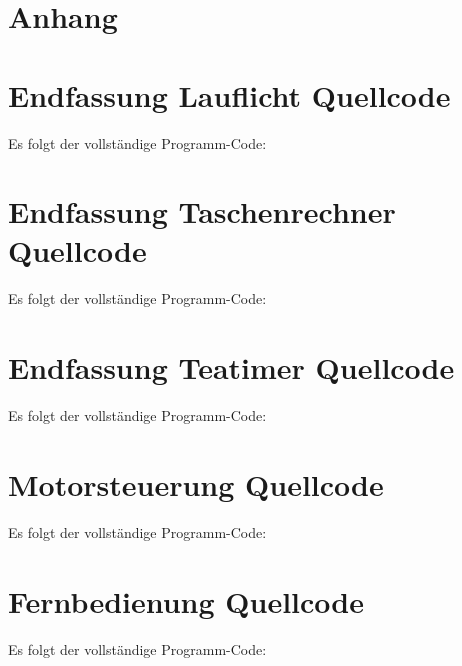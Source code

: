 \documentclass[12pt,a4paper,bibliography=totocnumbered,listof=totocnumbered]{scrartcl}
\begin{document}
\begin{appendix}
	\section*{Anhang}
	
	\section{Endfassung Lauflicht Quellcode}
	\label{sec:Lauflicht}
	Es folgt der vollständige Programm-Code:
	\vspace{1em}
	
	
	\pagebreak
	
	\section{Endfassung Taschenrechner Quellcode}
	\label{sec:Taschenrechner}
	Es folgt der vollständige Programm-Code:
	\vspace{1em}
	
	
	\pagebreak
	
	\section{Endfassung Teatimer Quellcode}
	\label{sec:Teatimer}
	Es folgt der vollständige Programm-Code:
	
	\vspace{1em}
	
	
	\pagebreak
	
	\section{Motorsteuerung Quellcode}
	\label{sec:Motorsteuerung}
	Es folgt der vollständige Programm-Code:
	
	\vspace{1em}
	
	
	\pagebreak
	
	\section{Fernbedienung Quellcode}
	\label{sec:Fernbedienung}
	Es folgt der vollständige Programm-Code:
	
	\vspace{1em}
	
	
	\pagebreak
	
\end{appendix}
\end{document}

